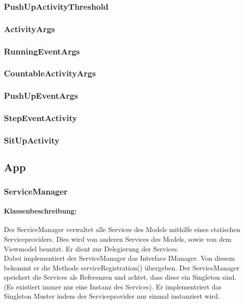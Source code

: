 \documentclass[a4paper,12pt]{article}
\begin{document}
	\subsubsection{PushUpActivityThreshold}
	
	\subsubsection{ActivityArgs}
	\subsubsection{RunningEventArgs}
	
	\subsubsection{CountableActivityArgs}
	\subsubsection{PushUpEventArgs}
	\subsubsection{StepEventActivity}
	\subsubsection{SitUpActivity}
	

\subsection{App}
\subsubsection{ServiceManager}
	\paragraph{Klassenbeschreibung:}
	Der ServiceManager verwaltet alle Services des Models mithilfe eines statischen Serviceproviders. Dies wird von anderen Services des Models, sowie von dem Viewmodel benutzt. Er dient zur Delegierung der Services.\\ 
	Dabei implementiert der ServiceManager das Interface IManager.
	Von diesem bekommt er die Methode serviceRegistration() übergeben.
	Der ServiceManager speichert die Services als Referenzen und achtet, dass diese ein Singleton sind. (Es existiert immer nur eine Instanz des Services).
	Er implementriert das Singleton Muster indem der Serviceprovider nur einmal instanziert wird.
	
\end{document}
